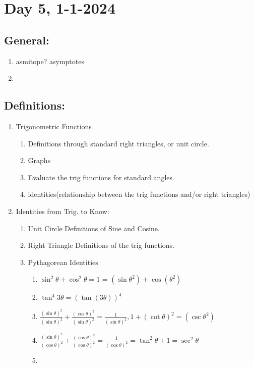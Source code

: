 \documentclass[12pt]{article}
\begin{document}
\section{Day 5, 1-1-2024}
\subsection{General: }
\begin{enumerate}
    \item asmitope? asymptotes
    \item 
\end{enumerate}
\subsection{Definitions: }
\begin{enumerate}
    \item Trigonometric Functions
    \begin{enumerate}
        \item Definitions through standard right triangles, or unit circle.
        \item Graphs
        \item Evaluate the trig functions for standard angles.
        \item identities(relationship between the trig functions and/or right triangles)
    \end{enumerate}
    \item Identities from Trig. to Know:
    \begin{enumerate}
        \item Unit Circle Definitions of Sine and Cosine.
        \item Right Triangle Definitions of the trig functions.
        \item Pythagorean Identities
        \begin{enumerate}
            \item \(\sin^2\theta + \cos^2\theta = 1\) = \((\sin\theta^2) + \cos(\theta^2)\)
            \item \(\tan^4 3\theta = (\tan(3\theta))^4\)
            \item \(\frac{(\sin\theta)^2}{(\sin\theta)^2} + \frac{(\cos\theta)^2}{(\sin\theta)^2} = \frac{1}{(\sin\theta)^2}, 1 + (\cot\theta)^2 = (\csc\theta^2)\)
            \item \(\frac{(\sin\theta)^2}{(\cos\theta)^2} + \frac{(\cos\theta)^2}{(\cos\theta)^2} = \frac{1}{(\cos\theta)^2} = \tan^2\theta + 1 = \sec^2\theta\)
            \item 

\end{enumerate}
\end{enumerate}
\end{enumerate}
\end{document}
